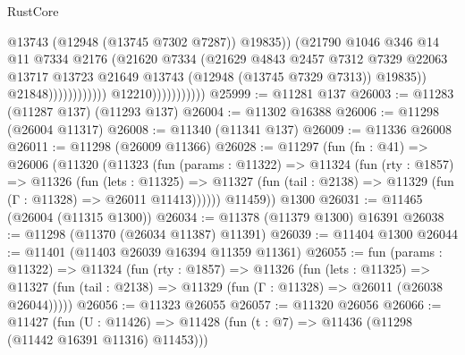 \begin{lexlean}{RustCore}
\begin{coremodule}
                                                    @13743
                                                    (@12948 (@13745 @7302 @7287))
                                                    @19835))
                                                (@21790
                                                  @1046
                                                  @346
                                                  @14
                                                  @11
                                                  @7334
                                                  @2176
                                                  (@21620
                                                    @7334
                                                    (@21629
                                                      @4843
                                                      @2457
                                                      @7312
                                                      @7329
                                                      @22063
                                                      @13717
                                                      @13723
                                                      @21649
                                                      @13743
                                                      (@12948 (@13745 @7329 @7313))
                                                      @19835))
                                                  @21848))))))))))))
                          @12210)))))))))))
@25999 := @11281 @137
@26003 := @11283 (@11287 @137) (@11293 @137)
@26004 := @11302 @16388
@26006 := @11298 (@26004 @11317)
@26008 := @11340 (@11341 @137)
@26009 := @11336 @26008
@26011 := @11298 (@26009 @11366)
@26028 := @11297
    (fun (fn : @41) =>
    @26006
      (@11320
        (@11323
          (fun (params : @11322) =>
          @11324
            (fun (rty : @1857) =>
            @11326
              (fun (lets : @11325) =>
              @11327 (fun (tail : @2138) => @11329 (fun (Γ : @11328) => @26011 @11413))))))
        @11459))
    @1300
@26031 := @11465 (@26004 (@11315 @1300))
@26034 := @11378 (@11379 @1300) @16391
@26038 := @11298 (@11370 (@26034 @11387) @11391)
@26039 := @11404 @1300
@26044 := @11401 (@11403 @26039 @16394 @11359 @11361)
@26055 := fun (params : @11322) =>
  @11324
    (fun (rty : @1857) =>
    @11326
      (fun (lets : @11325) =>
      @11327 (fun (tail : @2138) => @11329 (fun (Γ : @11328) => @26011 (@26038 @26044)))))
@26056 := @11323 @26055
@26057 := @11320 @26056
@26066 := @11427
    (fun (U : @11426) => @11428 (fun (t : @7) => @11436 (@11298 (@11442 @16391 @11316) @11453)))

\end{coremodule}
\end{lexlean}
